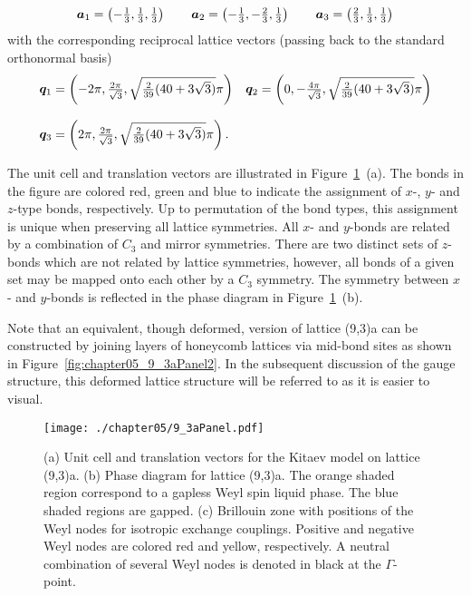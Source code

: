 %
\begin{equation}
	\begin{matrix*}[l]
		\ba_1 = \left(-\frac{1}{3}, \frac{1}{3}, \frac{1}{3}\right) \qquad
		\ba_2 = \left(-\frac{1}{3}, -\frac{2}{3}, \frac{1}{3}\right) \qquad
		\ba_3 = \left(\frac{2}{3}, \frac{1}{3}, \frac{1}{3}\right)
	\end{matrix*}
\end{equation}
%
with the corresponding reciprocal lattice vectors (passing back to the standard orthonormal basis)\pagebreak
%
\begin{equation}
	\begin{matrix*}[l]
		\bq_1 = \left(-2\pi, \frac{2\pi}{\sqrt{3}}, \sqrt{\frac{2}{39}(40 + 3\sqrt{3})}\pi\right) &
		\bq_2 = \left(0, -\frac{4\pi}{\sqrt{3}}, \sqrt{\frac{2}{39}(40 + 3\sqrt{3})}\pi\right) \\
		&\\
		\bq_3 = \left(2\pi, \frac{2\pi}{\sqrt{3}}, \sqrt{\frac{2}{39}(40 + 3\sqrt{3})}\pi\right). &
	\end{matrix*}
\end{equation}
%

The unit cell and translation vectors are illustrated in Figure~\ref{fig:chapter05_9_3aPanel}~(a).
The bonds in the figure are colored red, green and blue to indicate the assignment of $x$-, $y$- and $z$-type bonds, respectively.
Up to permutation of the bond types, this assignment is unique when preserving all lattice symmetries.
All $x$- and $y$-bonds are related by a combination of $C_3$ and mirror symmetries.
There are two distinct sets of $z$-bonds which are not related by lattice symmetries, however, all bonds of a given set may be mapped onto each other by a $C_3$ symmetry.
The symmetry between $x$- and $y$-bonds is reflected in the phase diagram in Figure~\ref{fig:chapter05_9_3aPanel}~(b).

Note that an equivalent, though deformed, version of lattice (9,3)a can be constructed by joining layers of honeycomb lattices via mid-bond sites as shown in Figure~\ref{fig:chapter05_9_3aPanel2}.
In the subsequent discussion of the gauge structure, this deformed lattice structure will be referred to as it is easier to visual.
%
\begin{figure}[tb]
	\centering
	\texttt{[image: ./chapter05/9\_3aPanel.pdf]}
	\caption{
		(a) Unit cell and translation vectors for the Kitaev model on lattice (9,3)a.
		(b) Phase diagram for lattice (9,3)a.
		The orange shaded region correspond to a gapless Weyl spin liquid phase.
		The blue shaded regions are gapped.
		(c) Brillouin zone with positions of the Weyl nodes for isotropic exchange couplings.
		Positive and negative Weyl nodes are colored red and yellow, respectively.
		A neutral combination of several Weyl nodes is denoted in black at the $\Gamma$-point.
	}
	\label{fig:chapter05_9_3aPanel}
\end{figure}
%


